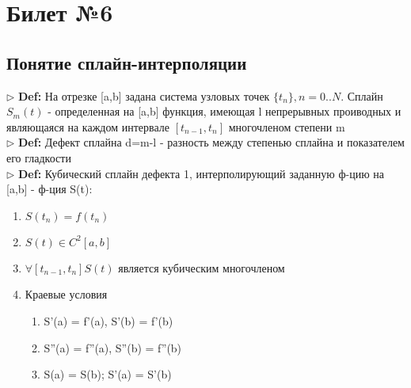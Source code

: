 \documentclass[a4paper]{article}
\begin{document}
\section{Билет №6}
\subsection{Понятие сплайн-интерполяции}

$\triangleright$ \textbf{Def:} На отрезке [a,b] задана система узловых точек $\{t_n\}, n=0..N$. Сплайн $S_m(t)$ - определенная на [a,b] функция, имеющая l непрерывных проиводных и являющаяся на каждом интервале $[t_{n-1}, t_n]$ многочленом степени m \\
$\triangleright$ \textbf{Def:} Дефект сплайна d=m-l - разность между степенью сплайна и показателем его гладкости \\
$\triangleright$ \textbf{Def:} Кубический сплайн дефекта 1, интерполирующий заданную ф-цию на [a,b] - ф-ция S(t):
\begin{enumerate}
	\item $S(t_n) = f(t_n)$
	\item $S(t) \in C^2[a,b]$
	\item $\forall [t_{n-1},t_n] S(t)$ является кубическим многочленом
	\item Краевые условия \begin{enumerate}
		\item S'(a) = f'(a), S'(b) = f'(b)
		\item S''(a) = f''(a), S''(b) = f''(b)
		\item S(a) = S(b); S'(a) = S'(b)
	\end{enumerate}
\end{enumerate}
\end{document}
